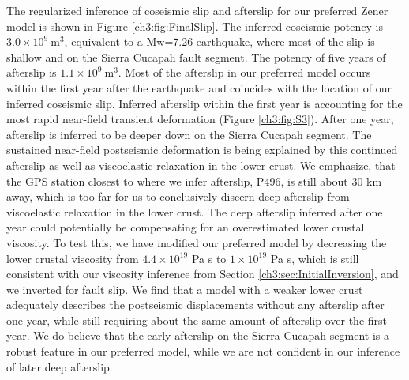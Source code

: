 The regularized inference of coseismic slip and afterslip for our
preferred Zener model is shown in Figure \ref{ch3:fig:FinalSlip}.  The
inferred coseismic potency is $3.0\times10^{9}\ \mathrm{m}^3$,
equivalent to a Mw=7.26 earthquake, where most of the slip is shallow
and on the Sierra Cucapah fault segment.  The potency of five years of
afterslip is $1.1\times10^{9}\ \mathrm{m}^3$. Most of the afterslip in
our preferred model occurs within the first year after the earthquake
and coincides with the location of our inferred coseismic slip.
Inferred afterslip within the first year is accounting for the most
rapid near-field transient deformation (Figure \ref{ch3:fig:S3}).  After one year,
afterslip is inferred to be deeper down on the Sierra Cucapah segment.
The sustained near-field postseismic deformation is being explained by
this continued afterslip as well as viscoelastic relaxation in the
lower crust. We emphasize, that the GPS station closest to where we
infer afterslip, P496, is still about 30 km away, which is too far for
us to conclusively discern deep afterslip from viscoelastic relaxation
in the lower crust.  The deep afterslip inferred after one year could
potentially be compensating for an overestimated lower crustal
viscosity.  To test this, we have modified our preferred model by
decreasing the lower crustal viscosity from $4.4\times10^{19}$ Pa s
to $1\times10^{19}$ Pa s, which is still consistent with our viscosity
inference from Section \ref{ch3:sec:InitialInversion}, and we inverted
for fault slip.  We find that a model with a weaker lower crust
adequately describes the postseismic displacements without any
afterslip after one year, while still requiring about the same amount
of afterslip over the first year. We do believe that the early
afterslip on the Sierra Cucapah segment is a robust feature in our
preferred model, while we are not confident in our inference of later
deep afterslip.

